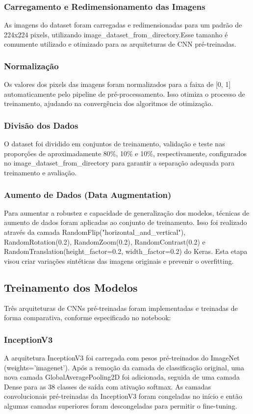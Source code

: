 \documentclass[12pt]{article}
\begin{document}
\subsubsection*{Carregamento e Redimensionamento das Imagens}
As imagens do dataset foram carregadas e redimensionadas para um padrão de 224x224 pixels, utilizando image\_dataset\_from\_directory.Esse tamanho é comumente utilizado e otimizado para as arquiteturas de CNN pré-treinadas. 
\subsubsection*{Normalização}
Os valores dos pixels das imagens foram normalizados para a faixa de [0, 1] automaticamente pelo pipeline de pré-processamento. Isso otimiza o processo de treinamento, ajudando na convergência dos algoritmos de otimização. 
\subsubsection*{Divisão dos Dados}
O dataset foi dividido em conjuntos de treinamento, validação e teste nas proporções de aproximadamente 80\%, 10\% e 10\%, respectivamente, configurados no image\_dataset\_from\_directory para garantir a separação adequada para treinamento e avaliação. 
\subsubsection*{Aumento de Dados (Data Augmentation)}
Para aumentar a robustez e capacidade de generalização dos modelos, técnicas de aumento de dados foram aplicadas ao conjunto de treinamento. Isso foi realizado através da camada RandomFlip("horizontal\_and\_vertical"), RandomRotation(0.2), RandomZoom(0.2), RandomContrast(0.2) e RandomTranslation(height\_factor=0.2, width\_factor=0.2) do Keras. Esta etapa visou criar variações sintéticas das imagens originais e prevenir o overfitting. 
\subsection{Treinamento dos Modelos}
Três arquiteturas de CNNs pré-treinadas foram implementadas e treinadas de forma comparativa, conforme especificado no notebook: 
\subsubsection*{InceptionV3}
A arquitetura InceptionV3 foi carregada com pesos pré-treinados do ImageNet (weights='imagenet'). Após a remoção da camada de classificação original, uma nova camada GlobalAveragePooling2D foi adicionada, seguida de uma camada Dense para as 38 classes de saída com ativação softmax. As camadas convolucionais pré-treinadas da InceptionV3 foram congeladas no início e então algumas camadas superiores foram descongeladas para permitir o fine-tuning. 
\end{document}
